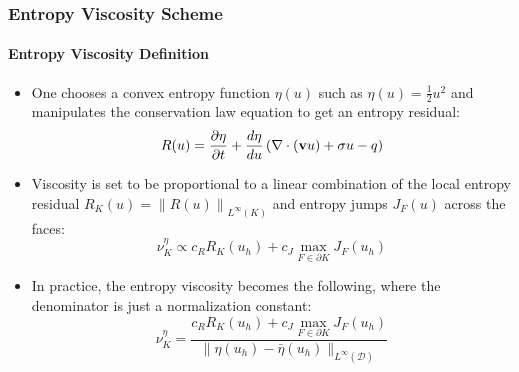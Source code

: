 \documentclass{beamer}
\begin{document}
\begin{frame}
\frametitle{Entropy Viscosity Scheme}
\framesubtitle{Entropy Viscosity Definition}

\begin{itemize}
   \item One chooses a convex entropy function $\eta(u)$ such
   as $\eta(u)=\frac{1}{2}u^2$ and manipulates the
   conservation law equation to get an entropy residual:
   \begin{equation}
      R(u) = \frac{\partial \eta}{\partial t}
      + \frac{d\eta}{du}\left(\nabla\cdot(\mathbf{v}u)
      + \sigma u 
      - q \right)
   \end{equation}
   \item Viscosity is set to be proportional to a linear combination
      of the local entropy residual $R_K(u) = \left\|R(u)\right\|_{L^\infty(K)}$
      and entropy jumps $J_F(u)$ across the faces:
      \begin{equation}
         \nu^{\eta}_K \propto c_R R_K(u_h)
         + c_J\max\limits_{F\in\partial K}J_F(u_h)
      \end{equation}
   \item In practice, the entropy viscosity becomes the following, where the
      denominator is just a normalization constant:
      \begin{equation}
         \nu^{\eta}_K = \frac{c_R R_K(u_h)
         + c_J\max\limits_{F\in\partial K}J_F(u_h)}
         {\|\eta(u_h)-\bar{\eta}(u_h)\|_{L^\infty(\mathcal{D})}}
      \end{equation}
\end{itemize}
   
\end{frame}
\end{document}

